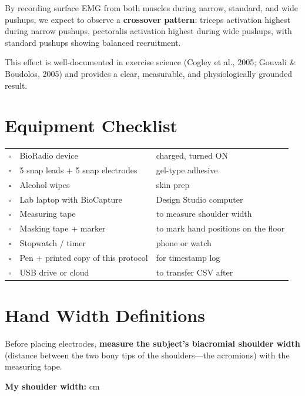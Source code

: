 \documentclass[11pt,letterpaper]{article}
\begin{document}
By recording surface EMG from both muscles during narrow, standard, and wide pushups, we expect to observe a \textbf{crossover pattern}: triceps activation highest during narrow pushups, pectoralis activation highest during wide pushups, with standard pushups showing balanced recruitment.

This effect is well-documented in exercise science (Cogley et al., 2005; Gouvali \& Boudolos, 2005) and provides a clear, measurable, and physiologically grounded result.

\section{Equipment Checklist}

\begin{center}
\begin{tabular}{@{} c l l @{}}
\toprule
$\square$ & BioRadio device & charged, turned ON \\
$\square$ & 5 snap leads + 5 snap electrodes & gel-type adhesive \\
$\square$ & Alcohol wipes & skin prep \\
$\square$ & Lab laptop with BioCapture & Design Studio computer \\
$\square$ & Measuring tape & to measure shoulder width \\
$\square$ & Masking tape + marker & to mark hand positions on the floor \\
$\square$ & Stopwatch / timer & phone or watch \\
$\square$ & Pen + printed copy of this protocol & for timestamp log \\
$\square$ & USB drive or cloud & to transfer CSV after \\
\bottomrule
\end{tabular}
\end{center}

\section{Hand Width Definitions}

Before placing electrodes, \textbf{measure the subject's biacromial shoulder width} (distance between the two bony tips of the shoulders---the acromions) with the measuring tape.

\vspace{0.2cm}
\textbf{My shoulder width:} \underline{\hspace{3cm}} cm
\vspace{0.2cm}
\end{document}
